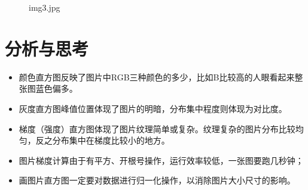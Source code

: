 \documentclass[12pt,a4paper]{article}
\begin{document}
\begin{figure}[H]
	\caption{img3.jpg}
	\centering
\end{figure}
\section{分析与思考}
\begin{itemize}
\item 颜色直方图反映了图片中RGB三种颜色的多少，比如B比较高的人眼看起来整张图蓝色偏多。
\item 灰度直方图峰值位置体现了图片的明暗，分布集中程度则体现为对比度。
\item 梯度（强度）直方图体现了图片纹理简单或复杂。纹理复杂的图片分布比较均匀，反之分布集中在梯度比较小的地方。
\item 图片梯度计算由于有平方、开根号操作，运行效率较低，一张图要跑几秒钟；
\item 画图片直方图一定要对数据进行归一化操作，以消除图片大小尺寸的影响。
\end{itemize}
\end{document}
